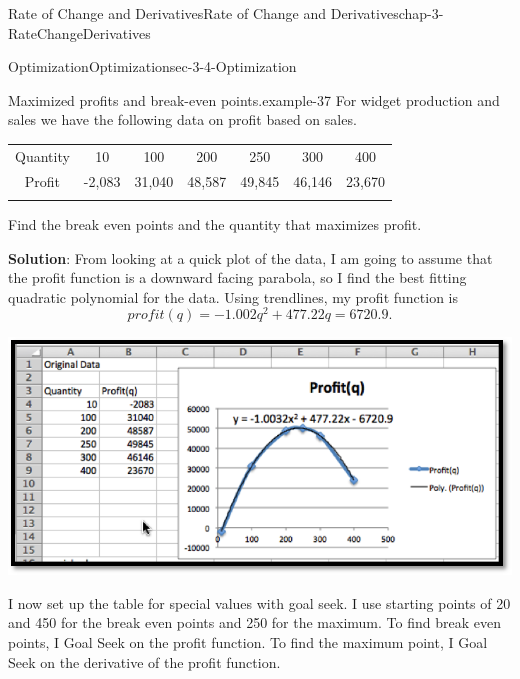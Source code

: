 \documentclass[oneside,10pt,]{book}
\newcommand{\terminology}[1]{\textbf{#1}}
\numberwithin{equation}{section}
\newcommand{\hrulethin}  {\noalign{\hrule height 0.04em}}
\newcommand{\hrulethick} {\noalign{\hrule height 0.11em}}
\begin{document}
\begin{chapterptx}{Rate of Change and Derivatives}{}{Rate of Change and Derivatives}{}{}{chap-3-RateChangeDerivatives}
\begin{sectionptx}{Optimization}{}{Optimization}{}{}{sec-3-4-Optimization}
\begin{example}{Maximized profits and break-even points.}{example-37}%
\hypertarget{p-1230}{}%
For widget production and sales we have the following data on profit based on sales.%
\begin{sidebyside}{1}{0}{0}{0}%
\begin{sbspanel}{1}%
{\centering%
\begin{tabular}{ccccccc}\hrulethick
Quantity&10&100&200&250&300&400\tabularnewline\hrulethin
Profit&-\textdollar{}2,083&\textdollar{}31,040&\textdollar{}48,587&\textdollar{}49,845&\textdollar{}46,146&\textdollar{}23,670\tabularnewline\hrulethin
\end{tabular}
\par}
\end{sbspanel}%
\end{sidebyside}%
\par
\hypertarget{p-1231}{}%
Find the break even points and the quantity that maximizes profit.%
\par
\hypertarget{p-1232}{}%
\terminology{Solution}:  From looking at a quick plot of the data, I am going to assume that the profit function is a downward facing parabola, so I find the best fitting quadratic polynomial for the data.  Using trendlines, my profit function is%
%
\begin{equation*}
profit(q)=-1.002 q^2+477.22 q=6720.9.
\end{equation*}
\begin{sidebyside}{1}{0.15}{0.15}{0}%
\begin{sbspanel}{0.7}%
\includegraphics[width=1\linewidth]{images/sec3-4-9.png}
\end{sbspanel}%
\end{sidebyside}%
\par
\hypertarget{p-1233}{}%
I now set up the table for special values with goal seek.  I use starting points of 20 and 450 for the break even points and 250 for the maximum.  To find break even points, I Goal Seek on the profit function.  To find the maximum point, I Goal Seek on the derivative of the profit function.%

\end{example}
\end{sectionptx}
\end{chapterptx}
\end{document}
